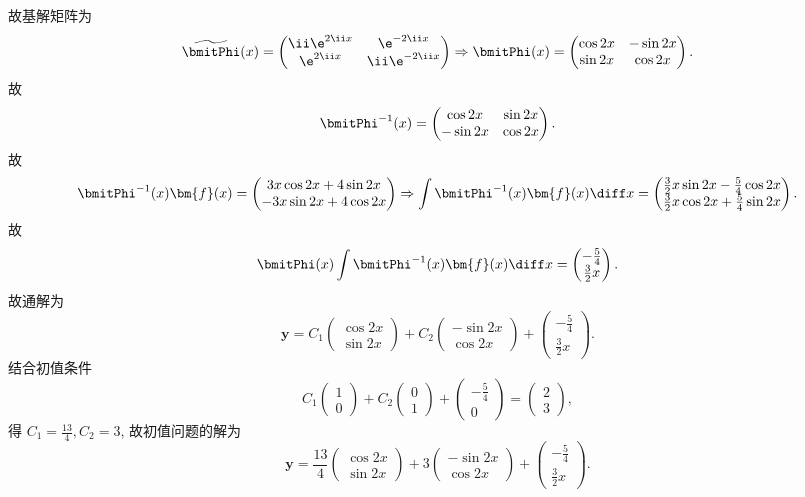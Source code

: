 \begin{solve}
  故基解矩阵为
  \[\widetilde{\bmitPhi}(x) =
    \begin{pmatrix}
      \ii\e^{2\ii x}&\e^{-2\ii x} \\
      \e^{2\ii x}&\ii\e^{-2\ii x}
    \end{pmatrix}\Rightarrow\bmitPhi(x) =
    \begin{pmatrix}\cos2x&-\sin2x\\\sin2x&\cos2x\end{pmatrix}.\]
  故
  \[\bmitPhi^{-1}(x)=\begin{pmatrix}\cos2x&\sin2x\\-\sin2x&\cos2x\end{pmatrix}.\]
  故
  \[\bmitPhi^{-1}(x)\bm{f}(x) = 
    \begin{pmatrix}3x\cos2x+4\sin2x\\-3x\sin2x+4\cos2x\end{pmatrix}
    \Rightarrow
    \int\bmitPhi^{-1}(x)\bm{f}(x)\diff x =
    \begin{pmatrix}
      \frac{3}{2}x\sin2x-\frac{5}{4}\cos2x \\
      \frac{3}{2}x\cos2x+\frac{5}{4}\sin2x
    \end{pmatrix}.\]
  故
  \[\bmitPhi(x)\int\bmitPhi^{-1}(x)\bm{f}(x)\diff x =
    \begin{pmatrix}-\frac{5}{4}\\\frac{3}{2}x\end{pmatrix}.\]
  故通解为
  \[\bm{y} = C_1\begin{pmatrix}\cos2x\\\sin2x\end{pmatrix}
    + C_2\begin{pmatrix}-\sin2x\\\cos2x\end{pmatrix}
    + \begin{pmatrix}-\frac{5}{4}\\\frac{3}{2}x\end{pmatrix}.\]
  结合初值条件
  \[C_1\begin{pmatrix}1\\0\end{pmatrix}
    + C_2\begin{pmatrix}0\\1\end{pmatrix}
    + \begin{pmatrix}-\frac{5}{4}\\0\end{pmatrix}
    = \begin{pmatrix}2\\3\end{pmatrix},\]
  得 $C_1=\frac{13}{4},C_2=3$, 故初值问题的解为
  \[\bm{y} =
    \frac{13}{4}\begin{pmatrix}\cos2x\\\sin2x\end{pmatrix}
    + 3\begin{pmatrix}-\sin2x\\\cos2x\end{pmatrix}
    + \begin{pmatrix}-\frac{5}{4}\\\frac{3}{2}x\end{pmatrix}.\]


\end{solve}
